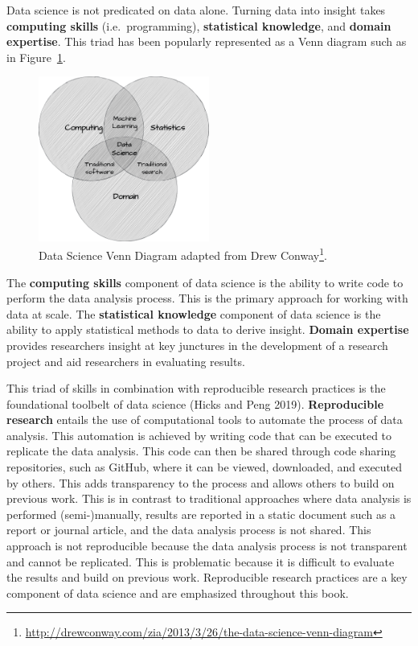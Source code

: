 \documentclass[
  letterpaper,
]{latex/krantz}
\DeclareRobustCommand{\href}[2]{#2\footnote{\url{#1}}}
\begin{document}
Data science is not predicated on data alone. Turning data into insight
takes \textbf{computing skills} (i.e.~programming), \textbf{statistical
knowledge}, and \textbf{domain expertise}. This triad has been popularly
represented as a Venn diagram such as in
Figure~\ref{fig-intro-data-science-venn}.

\begin{figure}[h]

{\centering \includegraphics[width=0.5\textwidth,height=\textheight]{figures/text-analysis/ta-ds-venn.drawio.png}

}

\caption{\label{fig-intro-data-science-venn}Data Science Venn Diagram
adapted from
\href{http://drewconway.com/zia/2013/3/26/the-data-science-venn-diagram}{Drew
Conway}.}

\end{figure}

The \textbf{computing skills} component of data science is the ability
to write code to perform the data analysis process. This is the primary
approach for working with data at scale. The \textbf{statistical
knowledge} component of data science is the ability to apply statistical
methods to data to derive insight. \textbf{Domain expertise} provides
researchers insight at key junctures in the development of a research
project and aid researchers in evaluating results.

This triad of skills in combination with reproducible research practices
is the foundational toolbelt of data science (Hicks and Peng 2019).
\textbf{Reproducible research} entails the
use of computational tools to automate the process of data analysis.
This automation is achieved by writing code that can be executed to
replicate the data analysis. This code can then be shared through code
sharing repositories, such as GitHub, where it can be viewed,
downloaded, and executed by others. This adds transparency to the
process and allows others to build on previous work. This is in contrast
to traditional approaches where data analysis is performed
(semi-)manually, results are reported in a static document such as a
report or journal article, and the data analysis process is not shared.
This approach is not reproducible because the data analysis process is
not transparent and cannot be replicated. This is problematic because it
is difficult to evaluate the results and build on previous work.
Reproducible research practices are a key component of data science and
are emphasized throughout this book.
\end{document}
